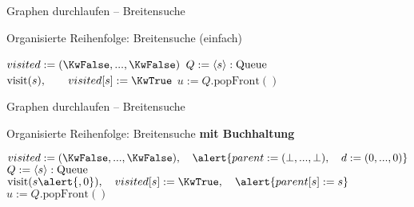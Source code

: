 \begin{frame}{Graphen durchlaufen – Breitensuche}
	\vspace{-1.3\baselineskip}
	\begin{exampleblock}{Organisierte Reihenfolge: Breitensuche (einfach)}
		\begin{algorithm}[H]
			 {
				$visited := (\KwFalse, ... , \KwFalse)$\;
				$Q := \llist{s}: \|Queue|$ \;
				$\|visit|(s),\hphantom{, 0} \quad visited[s] := \KwTrue$ \;
				 {
					$u := Q.\text{popFront}()$\;
				} 
			}
		\end{algorithm} 
	\end{exampleblock}
\end{frame}

\begin{frame}{Graphen durchlaufen – Breitensuche}
	\vspace{-1.3\baselineskip}
	\begin{exampleblock}{Organisierte Reihenfolge: Breitensuche \textbf{mit Buchhaltung}}
		\begin{algorithm}[H] 
			 {
				$visited := (\KwFalse, ... , \KwFalse), \quad \alert{parent := (\bot, ..., \bot), \quad d := (0, ..., 0)}$\;
				$Q := \llist{s}: \|Queue|$ \;
				$\|visit|(s\alert{, 0}), \quad visited[s] := \KwTrue, \quad \alert{parent[s] := s}$ \;
				 {
					$u := Q.\text{popFront}()$\;
				} 
			}
		\end{algorithm} 
	\end{exampleblock}
\end{frame}

